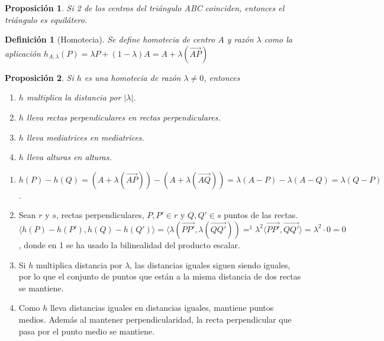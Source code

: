 \documentclass[11pt, a4paper]{article}
\makeatletter
\newif\IfInSansMode
\let\oldsf\sffamily
\renewcommand*{\sffamily}{\oldsf\mathversion{sans}\InSansModetrue}
\let\oldnorm\normalfont
\renewcommand*{\normalfont}{\oldnorm\InSansModefalse\mathversion{normal}}
\renewenvironment{proof}[1][\proofname] {\vspace{-15pt}\par\pushQED{\qed}\normalfont\topsep6\p@\@plus6\p@\relax\trivlist\item[\hskip\labelsep\it#1\@addpunct{.}]\ignorespaces}{\popQED\endtrivlist\@endpefalse}
\renewcommand{\vec}{\overrightarrow}
\renewenvironment{proof}[1][\proofname] {\par\pushQED{\qed}\normalfont\topsep6\p@\@plus6\p@\relax\trivlist\item[\hskip\labelsep\itshape\sffamily#1\@addpunct{.}]\ignorespaces}{\popQED\endtrivlist\@endpefalse}
\theoremstyle{theorem-style}
\newtheorem{nprop}{Proposición}[section]
\theoremstyle{definition-style}
\newtheorem{ndef}{Definición}[section]
\theoremstyle{remark-style}
\theoremstyle{example-style}
\makeatother
\begin{document}
\begin{nprop}Si 2 de los centros del triángulo ABC coinciden, entonces el triángulo es equilátero.
\end{nprop}


\begin{ndef}[Homotecia]
  Se define homotecia de centro $A$ y razón $\lambda$ como la aplicación $h_{A,\lambda}(P) = \lambda P + (1-\lambda)A = A+\lambda(\vec{AP})$
\end{ndef}

\begin{nprop} Si $h$ es una homotecia de razón $\lambda\ne 0$, entonces 
\begin{enumerate}
\item $h$ multiplica la distancia por $|\lambda|$.
\item $h$ lleva rectas perpendiculares en rectas perpendiculares.
\item $h$ lleva mediatrices en mediatrices.
\item $h$ lleva alturas en alturas.
\end{enumerate}
\end{nprop}

\begin{proof}\hfill
\begin{enumerate}
	\item $h(P)-h(Q)=(A+\lambda(\vec{AP})) -(A+\lambda(\vec{AQ})) = \lambda(A-P) - \lambda(A-Q) = \lambda (Q-P)$.
	\item  Sean $r$ y $ s$, rectas perpendiculares, $P,P' \in r$ y $Q,Q'\in s$ puntos de las rectas. $\langle h(P) - h(P'),h(Q) - h(Q')\rangle  =  \langle \lambda (\vec{PP'}, \lambda(\vec {QQ'}))=^1 \lambda^2 \langle \vec{PP'},\vec{QQ'}\rangle  = \lambda^2 \cdot 0 = 0 $, donde en 1 se ha usado la bilinealidad del producto escalar.
	\item Si $h$ multiplica distancia por $\lambda$, las distancias iguales siguen siendo iguales, por lo que el conjunto de puntos que están a la misma distancia de dos rectas se mantiene.
	\item Como $h$ lleva distancias iguales en distancias iguales, mantiene puntos medios. Además al mantener perpendicularidad, la recta perpendicular que pasa por el punto medio se mantiene.
\end{enumerate}
\end{proof}
\end{document}
